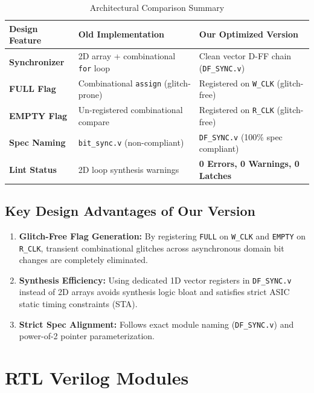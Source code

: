 \documentclass[12pt,a4paper]{article}
\begin{document}
\begin{table}[H]
\centering
\begin{tabular}{@{}lll@{}}
\toprule
\textbf{Design Feature} & \textbf{Old Implementation} & \textbf{Our Optimized Version} \\
\midrule
\textbf{Synchronizer} & 2D array + combinational \texttt{for} loop & Clean vector D-FF chain (\texttt{DF\_SYNC.v}) \\
\textbf{FULL Flag}    & Combinational \texttt{assign} (glitch-prone) & Registered on \texttt{W\_CLK} (glitch-free) \\
\textbf{EMPTY Flag}   & Un-registered combinational compare & Registered on \texttt{R\_CLK} (glitch-free) \\
\textbf{Spec Naming}  & \texttt{bit\_sync.v} (non-compliant) & \texttt{DF\_SYNC.v} (100\% spec compliant) \\
\textbf{Lint Status}  & 2D loop synthesis warnings & \textbf{0 Errors, 0 Warnings, 0 Latches} \\
\bottomrule
\end{tabular}
\caption{Architectural Comparison Summary}
\end{table}

\subsection{Key Design Advantages of Our Version}
\begin{enumerate}
    \item \textbf{Glitch-Free Flag Generation:} By registering \texttt{FULL} on \texttt{W\_CLK} and \texttt{EMPTY} on \texttt{R\_CLK}, transient combinational glitches across asynchronous domain bit changes are completely eliminated.
    \item \textbf{Synthesis Efficiency:} Using dedicated 1D vector registers in \texttt{DF\_SYNC.v} instead of 2D arrays avoids synthesis logic bloat and satisfies strict ASIC static timing constraints (STA).
    \item \textbf{Strict Spec Alignment:} Follows exact module naming (\texttt{DF\_SYNC.v}) and power-of-2 pointer parameterization.
\end{enumerate}

\section{RTL Verilog Modules}
\end{document}
